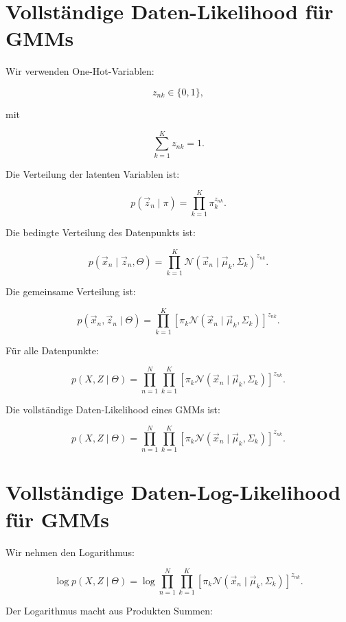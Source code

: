 \section{Vollständige Daten-Likelihood für GMMs}

Wir verwenden One-Hot-Variablen:

\[
    z_{nk}\in\{0,1\},
\]

mit

\[
    \sum_{k=1}^{K}
    z_{nk}=1.
\]

Die Verteilung der latenten Variablen ist:

\[
    p(\vec{z}_n\mid\pi)
    =
    \prod_{k=1}^{K}
    \pi_k^{z_{nk}}.
\]

Die bedingte Verteilung des Datenpunkts ist:

\[
    p(\vec{x}_n\mid\vec{z}_n,\Theta)
    =
    \prod_{k=1}^{K}
    \mathcal{N}(\vec{x}_n\mid\vec{\mu}_k,\Sigma_k)^{z_{nk}}.
\]

Die gemeinsame Verteilung ist:

\[
    p(\vec{x}_n,\vec{z}_n\mid\Theta)
    =
    \prod_{k=1}^{K}
    \left[
        \pi_k
        \mathcal{N}(\vec{x}_n\mid\vec{\mu}_k,\Sigma_k)
    \right]^{z_{nk}}.
\]

Für alle Datenpunkte:

\[
    p(X,Z\mid\Theta)
    =
    \prod_{n=1}^{N}
    \prod_{k=1}^{K}
    \left[
        \pi_k
        \mathcal{N}(\vec{x}_n\mid\vec{\mu}_k,\Sigma_k)
    \right]^{z_{nk}}.
\]

\begin{definitionbox}
Die vollständige Daten-Likelihood eines GMMs ist:

\[
    p(X,Z\mid\Theta)
    =
    \prod_{n=1}^{N}
    \prod_{k=1}^{K}
    \left[
        \pi_k
        \mathcal{N}(\vec{x}_n\mid\vec{\mu}_k,\Sigma_k)
    \right]^{z_{nk}}.
\]
\end{definitionbox}

\section{Vollständige Daten-Log-Likelihood für GMMs}

Wir nehmen den Logarithmus:

\[
    \log p(X,Z\mid\Theta)
    =
    \log
    \prod_{n=1}^{N}
    \prod_{k=1}^{K}
    \left[
        \pi_k
        \mathcal{N}(\vec{x}_n\mid\vec{\mu}_k,\Sigma_k)
    \right]^{z_{nk}}.
\]

Der Logarithmus macht aus Produkten Summen:

